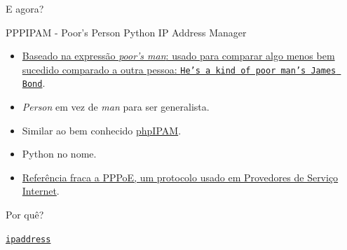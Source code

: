 \documentclass[11pt]{beamer}
\begin{document}
\begin{frame}[standout]
  E agora?
\end{frame}

\begin{frame}[fragile]{\small{PPPIPAM - Poor's Person Python IP Address Manager}}
  \begin{itemize}
    \item \href{https://www.macmillandictionary.com/dictionary/british/a-poor-man-s-something}{Baseado na expressão \textit{poor's man}: usado para comparar algo menos bem sucedido comparado a outra pessoa: \texttt{He’s a kind of poor man’s James Bond}}.
    \item \textit{Person} em vez de \textit{man} para ser generalista.
    \item Similar ao bem conhecido \href{https://phpipam.net/}{phpIPAM}.
    \item Python no nome.
    \item \href{https://en.wikipedia.org/wiki/Point-to-Point_Protocol_over_Ethernet}{Referência fraca a PPPoE, um protocolo usado em Provedores de Serviço Internet}.
  \end{itemize}
\end{frame}

\begin{frame}[standout]
  Por quê?
\end{frame}

\begin{frame}[fragile]{\href{https://docs.python.org/3/library/ipaddress.html}{\texttt{ipaddress}}}
   \hspace*{-.5cm}
\end{frame}
\end{document}
